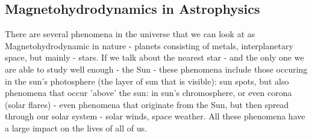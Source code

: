 \subsection{Magnetohydrodynamics in Astrophysics}
There are several phenomena in the universe that we can look at as Magnetohydrodynamic in nature - planets consisting of metals, interplanetary space, but mainly - stars. If we talk about the nearest star - and the only one we are able to study well enough - the Sun - these phenomena include those occuring in the sun's photosphere (the layer of sun that is visible): sun spots, but also phenomena that occur 'above' the sun: in sun's chromosphere, or even corona (solar flares) - even phenomena that originate from the Sun, but then spread through our solar system - solar winds, space weather. All these phenomena have a large impact on the lives of all of us.